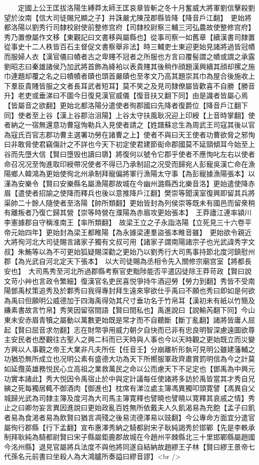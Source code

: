 　　定國上公王匡拔洛陽生縛莽太師王匡哀章皆斬之冬十月奮威大將軍劉信擊殺劉望於汝南【信大司徒賜兄顯之子】并誅嚴尤陳茂郡縣皆降【降音戶江翻】　更始將都洛陽以劉秀行司隸校尉使前整修宫府【司隸校尉察三輔三河弘農故使整修宫府】秀乃置僚屬作文移【東觀記曰文書移與屬縣也】從事司察一如舊章【續漢書司隸置從事史十二人秩皆百石主督促文書察舉非法】時三輔吏士東迎更始見諸將過皆冠幘而服婦人衣【漢官儀曰幘者古之卑賤不冠者之所服也方言曰覆髻謂之幘或謂之承露劉昭志曰秦雄諸侯乃加武將首飾為絳袙以表貴賤其後稍作顔題漢興續其顔却摞之施巾連題却覆之名之曰幘幘者賾也頭首嚴賾也至孝文乃高其題崇其巾為屋合後施收上下羣臣貴賤皆服之文者長耳武者短耳】莫不笑之及見司隸僚屬皆歡喜不自勝【勝音升】老吏或垂涕曰不圖今日復見漢官威儀【復音扶又翻下同】由是識者皆屬心焉【皆屬音之欲翻】更始北都洛陽分遣使者徇郡國曰先降者復爵位【降音戶江翻下同】使者至上谷【漢上谷郡治沮陽】上谷太守扶風耿况迎上印綬【上音時掌翻】使者納之一宿無還意功曹寇恂勒兵入見使者請之【姓譜蘇忿生為周武王司寇其後以官為寇氏百官志郡功曹主選署功勞在諸曹之上】使者不與曰天王使者功曹欲脅之邪恂曰非敢脅使君竊傷計之不詳也今天下初定使君建節䘖命郡國莫不延頸傾耳今始至上谷而先墮大信【賢曰墮毁也讀曰隳】將復何以號令它郡乎使者不應恂叱左右以使者命召况况至恂進取印綬帶况使者不得已乃承制詔之况受而歸宛人彭寵吳漢亡命在漁陽鄉人韓鴻為更始使徇北州承制拜寵偏將軍行漁陽太守事【為彭寵據漁陽張本】以漌為安樂令【賢曰安樂縣名屬漁陽郡故城在今幽州潞縣西北樂音洛】更始遣使降赤眉【遣使者招諭之使降而釋兵也後以意推降戶江翻】樊崇等聞漢室復興即留其兵將渠帥二十餘人隨使者至洛陽【帥所類翻】更始皆封為列侯崇等既未有國邑而留衆稍有離叛者乃復亡歸其營【崇等時營在濮陽為赤眉攻更始張本】　王莽廬江連率潁川李憲據郡自守稱淮南王【率所類翻】　故梁王立之子永詣洛陽【立死見三十六卷平帝元始四年】更始封為梁王都睢陽【為永據梁連羣盜張本睢音雖】　更始欲令親近大將徇河北大司徒賜言諸家子獨有文叔可用【諸家子謂南陽諸宗子也光武諱秀字文叔】朱鮪等以為不可更始狐疑賜深勸之更始乃以劉秀行大司馬事持節北度河鎮慰州郡【為光武自河北定天下張本】　以大司徒賜為丞相令先入關修宗廟宫室【將都長安也】　大司馬秀至河北所過郡縣考察官吏黜陟能否平遣囚徒除王莽苛政【賢曰說文苛小艸也言政令繁細】復漢官名吏民喜悦爭持牛酒迎勞【勞力到翻】秀皆不受南陽鄧禹杖策追秀及於鄴秀曰我得專封拜生遠來寧欲仕乎禹曰不願也秀曰即如是何欲為禹曰但願明公威德加于四海禹得効其尺寸垂功名于竹帛耳【漢初未有紙以竹簡及縑素書故言竹帛】秀笑因留宿間語【賢曰間私也】禹進說曰【說輸芮翻下同】今山東未安赤眉青犢之屬動以萬數更始既是常才而不自聽斷【斷丁亂翻】諸將皆庸人屈起【賢曰屈音求勿翻】志在財幣爭用威力朝夕自快而已非有忠良明智深慮遠圖欲尊主安民者也歷觀往古聖人之興二科而已天時與人事也今以天時觀之更始既立而災變方興以人事觀之帝王大業非凡夫所任【任音壬】分崩離析形埶可見明公雖建藩輔之功猶恐無所成立也况明公素有盛德大功為天下所嚮服軍政齊肅賞罰明信為今之計莫如延攬英雄務悦民心立高祖之業救萬民之命以公而慮天下不足定也【鄧禹為中興元功實本諸此】秀大悦因令禹宿止於中與定計議每任使諸將多訪於禹皆當其才秀自兄縯之死每獨居輒不御酒肉【御進也】枕席有涕泣處主簿馮異獨叩頭寛譬【馮異自父城歸光武為司隸主簿及度河為大司馬主簿寛釋也譬曉也譬曉以寛釋其哀戚之情】秀止之曰卿勿妄言異因進說曰更始政亂百姓無所依戴夫人久飢渴易為充飽【孟子曰飢者易為食渇者易為飲賢曰猶言凋殘之後易流德澤易以豉翻】今公專命方面宜分遣官屬徇行郡縣【行下孟翻】宣布惠澤秀納之騎都尉宋子耿純謁秀於邯鄲【先是李軼承制拜耿純為騎都尉賢曰宋子縣屬鉅鹿郡故城在今趙州平棘縣北三十里邯鄲縣屬趙國今洺州縣】退見官屬將兵法度不與他將同遂自結納故趙繆王子林【賢曰繆王景帝七代孫名元前書曰坐殺人為大鴻臚所奏謚曰繆音謬】<br />
